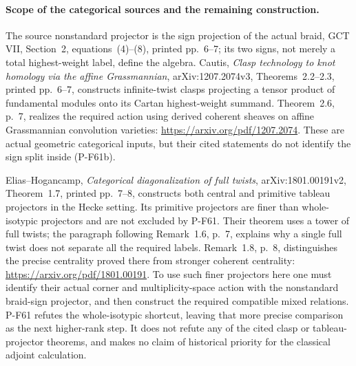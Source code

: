 \paragraph{Scope of the categorical sources and the remaining construction.}
The source nonstandard projector is the sign projection of the
actual braid, GCT VII, Section~2, equations~(4)--(8), printed
pp.~6--7; its two signs, not merely a total highest-weight
label, define the algebra.  Cautis, \emph{Clasp technology to
knot homology via the affine Grassmannian}, arXiv:1207.2074v3,
Theorems~2.2--2.3, printed pp.~6--7, constructs infinite-twist
clasps projecting a tensor product of fundamental modules onto
its Cartan highest-weight summand.  Theorem~2.6, p.~7, realizes
the required action using derived coherent sheaves on affine
Grassmannian convolution varieties:
\url{https://arxiv.org/pdf/1207.2074}.
These are actual geometric categorical inputs, but their cited
statements do not identify the sign split inside (P-F61b).

Elias--Hogancamp, \emph{Categorical diagonalization of full
twists}, arXiv:1801.00191v2, Theorem~1.7, printed pp.~7--8,
constructs both central and primitive tableau projectors in
the Hecke setting.  Its primitive projectors are finer than
whole-isotypic projectors and are not excluded by P-F61.
Their theorem uses a tower of full twists; the paragraph following
Remark~1.6, p.~7, explains why a single full twist does not
separate all the required labels.  Remark~1.8, p.~8, distinguishes the precise
centrality proved there from stronger coherent centrality:
\url{https://arxiv.org/pdf/1801.00191}.
To use such finer projectors here one must identify their
actual corner and multiplicity-space action with the
nonstandard braid-sign projector, and then construct the
required compatible mixed relations.  P-F61 refutes the
whole-isotypic shortcut, leaving that more precise comparison
as the next higher-rank step.  It does not refute any of the
cited clasp or tableau-projector theorems, and makes no claim
of historical priority for the classical adjoint calculation.
